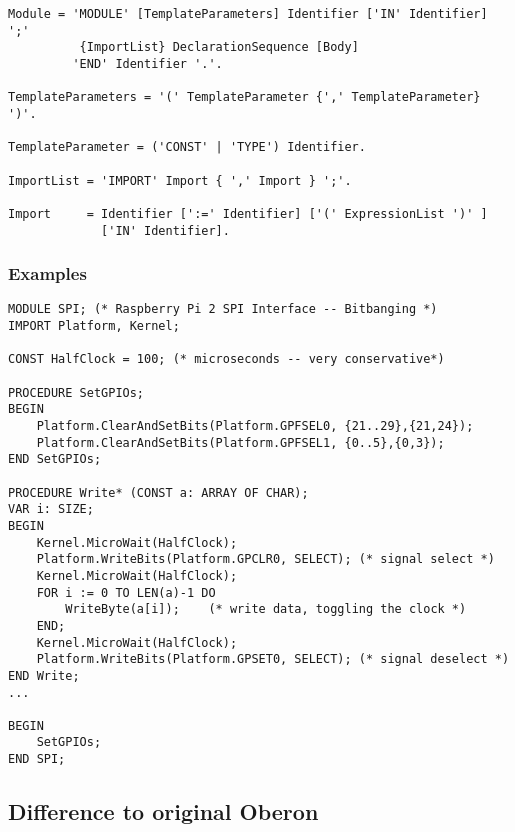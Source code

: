 \documentclass[a4wide,11pt]{article}
\begin{document}
\begin{lstlisting}[style=ebnf]
Module = 'MODULE' [TemplateParameters] Identifier ['IN' Identifier]  ';'
          {ImportList} DeclarationSequence [Body]
         'END' Identifier '.'.

TemplateParameters = '(' TemplateParameter {',' TemplateParameter} ')'.

TemplateParameter = ('CONST' | 'TYPE') Identifier.

ImportList = 'IMPORT' Import { ',' Import } ';'.

Import     = Identifier [':=' Identifier] ['(' ExpressionList ')' ]
             ['IN' Identifier].
\end{lstlisting}

\begin{annotation}
\subsubsection{Examples}
\begin{lstlisting}[style=example, caption=Example of a module (excerpt)]
MODULE SPI; (* Raspberry Pi 2 SPI Interface -- Bitbanging *)
IMPORT Platform, Kernel;

CONST HalfClock = 100; (* microseconds -- very conservative*)

PROCEDURE SetGPIOs;
BEGIN
	Platform.ClearAndSetBits(Platform.GPFSEL0, {21..29},{21,24});
	Platform.ClearAndSetBits(Platform.GPFSEL1, {0..5},{0,3});
END SetGPIOs;

PROCEDURE Write* (CONST a: ARRAY OF CHAR);
VAR i: SIZE;
BEGIN
	Kernel.MicroWait(HalfClock);
	Platform.WriteBits(Platform.GPCLR0, SELECT); (* signal select *)
	Kernel.MicroWait(HalfClock);
	FOR i := 0 TO LEN(a)-1 DO
		WriteByte(a[i]); 	(* write data, toggling the clock *)
	END;
	Kernel.MicroWait(HalfClock);
	Platform.WriteBits(Platform.GPSET0, SELECT); (* signal deselect *)
END Write;
...

BEGIN
	SetGPIOs;
END SPI;
\end{lstlisting}

\subsection{Difference to original Oberon}


\end{annotation}
\end{document}
